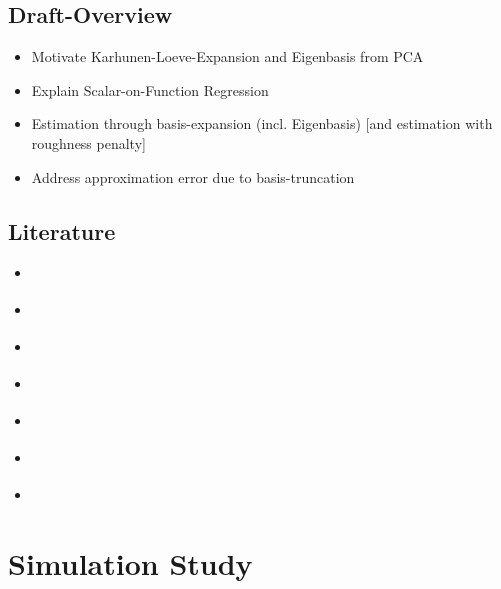 \documentclass[11pt,twoside,a4paper]{article}
\begin{document}
	\subsection{Draft-Overview}
	\begin{itemize}
		\item Motivate Karhunen-Loeve-Expansion and Eigenbasis from PCA		
		\item Explain Scalar-on-Function Regression
		\item Estimation through basis-expansion (incl. Eigenbasis) [and estimation with roughness penalty]
		\item Address approximation error due to basis-truncation
	\end{itemize}

	\subsection{Literature}
	\begin{itemize}
		\item \cite{alexanderian_KLexpansion_2015}
		\item \cite{kokoszka_introduction_2017}
		\item \cite{hsing_theoretical_2015}
		\item \cite{ramsay_functional_2005}
		\item \cite{horvath_inference_2012}
		\item \cite{cai_prediction_2006}
		\item \cite{levitin_introduction_2007}
	\end{itemize}
	
	\newpage
	\section{Simulation Study}
	
\end{document}
